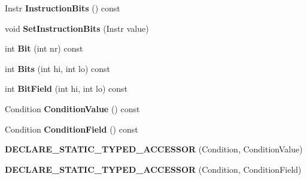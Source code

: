 \begin{DoxyCompactItemize}
\item 
Instr {\bfseries Instruction\+Bits} () const \hypertarget{classv8_1_1internal_1_1_instruction_afa0fa796cbf4e1d24cf72b5a910318b9}{}\label{classv8_1_1internal_1_1_instruction_afa0fa796cbf4e1d24cf72b5a910318b9}

\item 
void {\bfseries Set\+Instruction\+Bits} (Instr value)\hypertarget{classv8_1_1internal_1_1_instruction_a09df19b9577ff4a002c4f775b018d7a0}{}\label{classv8_1_1internal_1_1_instruction_a09df19b9577ff4a002c4f775b018d7a0}

\item 
int {\bfseries Bit} (int nr) const \hypertarget{classv8_1_1internal_1_1_instruction_ae6fd734924344b3ea773b8e8ffc63aa2}{}\label{classv8_1_1internal_1_1_instruction_ae6fd734924344b3ea773b8e8ffc63aa2}

\item 
int {\bfseries Bits} (int hi, int lo) const \hypertarget{classv8_1_1internal_1_1_instruction_a6924d0b3fa9f7007451ba4824ef9ce01}{}\label{classv8_1_1internal_1_1_instruction_a6924d0b3fa9f7007451ba4824ef9ce01}

\item 
int {\bfseries Bit\+Field} (int hi, int lo) const \hypertarget{classv8_1_1internal_1_1_instruction_a4951cb126b3eb6c5b046c5d663a86026}{}\label{classv8_1_1internal_1_1_instruction_a4951cb126b3eb6c5b046c5d663a86026}

\item 
Condition {\bfseries Condition\+Value} () const \hypertarget{classv8_1_1internal_1_1_instruction_ad4a246290c98caad20a4a8e424de8fb5}{}\label{classv8_1_1internal_1_1_instruction_ad4a246290c98caad20a4a8e424de8fb5}

\item 
Condition {\bfseries Condition\+Field} () const \hypertarget{classv8_1_1internal_1_1_instruction_a8737308b629178e6488a78076c4ae915}{}\label{classv8_1_1internal_1_1_instruction_a8737308b629178e6488a78076c4ae915}

\item 
{\bfseries D\+E\+C\+L\+A\+R\+E\+\_\+\+S\+T\+A\+T\+I\+C\+\_\+\+T\+Y\+P\+E\+D\+\_\+\+A\+C\+C\+E\+S\+S\+OR} (Condition, Condition\+Value)\hypertarget{classv8_1_1internal_1_1_instruction_afe9b3a70817b175939be8d1a34a79023}{}\label{classv8_1_1internal_1_1_instruction_afe9b3a70817b175939be8d1a34a79023}

\item 
{\bfseries D\+E\+C\+L\+A\+R\+E\+\_\+\+S\+T\+A\+T\+I\+C\+\_\+\+T\+Y\+P\+E\+D\+\_\+\+A\+C\+C\+E\+S\+S\+OR} (Condition, Condition\+Field)\hypertarget{classv8_1_1internal_1_1_instruction_aefb75415931ab56f48ec8612fd195fe1}{}\label{classv8_1_1internal_1_1_instruction_aefb75415931ab56f48ec8612fd195fe1}


\end{DoxyCompactItemize}
